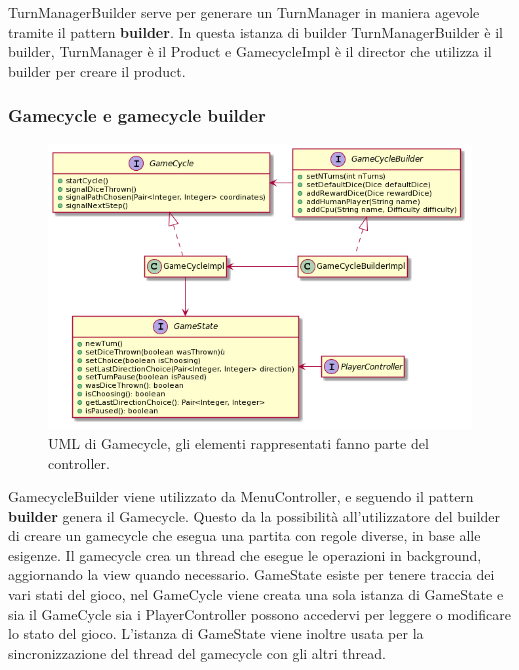 \documentclass[a4paper,12pt]{report}
\begin{document}
    TurnManagerBuilder serve per generare un TurnManager in maniera agevole tramite il pattern \textbf{builder}.
    In questa istanza di builder TurnManagerBuilder è il builder, TurnManager è il Product e GamecycleImpl è il director che utilizza il builder per creare il product.

    \subsubsection{Gamecycle e gamecycle builder}
    \begin{figure}[h]
    \centering{}
    \includegraphics[width=\textwidth]{images/freddi/GameCycle.png}
    \caption{UML di Gamecycle, gli elementi rappresentati fanno parte del controller.}
    \end{figure}

    GamecycleBuilder viene utilizzato da MenuController, e seguendo il pattern \textbf{builder} genera il Gamecycle.
    Questo da la possibilità all'utilizzatore del builder di creare un gamecycle che esegua una partita con regole diverse, in base alle esigenze.
    Il gamecycle crea un thread che esegue le operazioni in background, aggiornando la view quando necessario.
    GameState esiste per tenere traccia dei vari stati del gioco, nel GameCycle viene creata una sola istanza di GameState e sia il GameCycle sia i PlayerController possono accedervi per leggere o modificare lo stato del gioco.
    L'istanza di GameState viene inoltre usata per la sincronizzazione del thread del gamecycle con gli altri thread.
\end{document}
